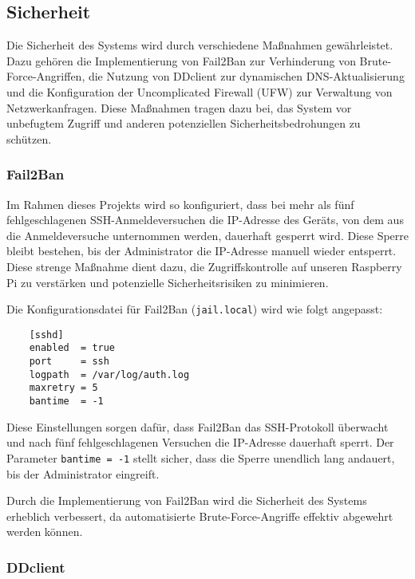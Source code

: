 
\subsection{Sicherheit}
Die Sicherheit des Systems wird durch verschiedene Maßnahmen gewährleistet. Dazu gehören die Implementierung von Fail2Ban zur Verhinderung von Brute-Force-Angriffen, die Nutzung von DDclient zur dynamischen DNS-Aktualisierung und die Konfiguration der Uncomplicated Firewall (UFW) zur Verwaltung von Netzwerkanfragen. Diese Maßnahmen tragen dazu bei, das System vor unbefugtem Zugriff und anderen potenziellen Sicherheitsbedrohungen zu schützen.

\subsubsection{Fail2Ban}

Im Rahmen dieses Projekts wird  so konfiguriert, dass bei mehr als fünf fehlgeschlagenen SSH-Anmeldeversuchen die IP-Adresse des Geräts, von dem aus die Anmeldeversuche unternommen werden, dauerhaft gesperrt wird. Diese Sperre bleibt bestehen, bis der Administrator die IP-Adresse manuell wieder entsperrt. Diese strenge Maßnahme dient dazu, die Zugriffskontrolle auf unseren Raspberry Pi zu verstärken und potenzielle Sicherheitsrisiken zu minimieren.

Die Konfigurationsdatei für Fail2Ban (\texttt{jail.local}) wird wie folgt angepasst:

\begin{verbatim}
	[sshd]
	enabled  = true
	port     = ssh
	logpath  = /var/log/auth.log
	maxretry = 5
	bantime  = -1
\end{verbatim}

Diese Einstellungen sorgen dafür, dass Fail2Ban das SSH-Protokoll überwacht und nach fünf fehlgeschlagenen Versuchen die IP-Adresse dauerhaft sperrt. Der Parameter \texttt{bantime = -1} stellt sicher, dass die Sperre unendlich lang andauert, bis der Administrator eingreift.

Durch die Implementierung von Fail2Ban wird die Sicherheit des Systems erheblich verbessert, da automatisierte Brute-Force-Angriffe effektiv abgewehrt werden können.

\subsubsection{DDclient}

